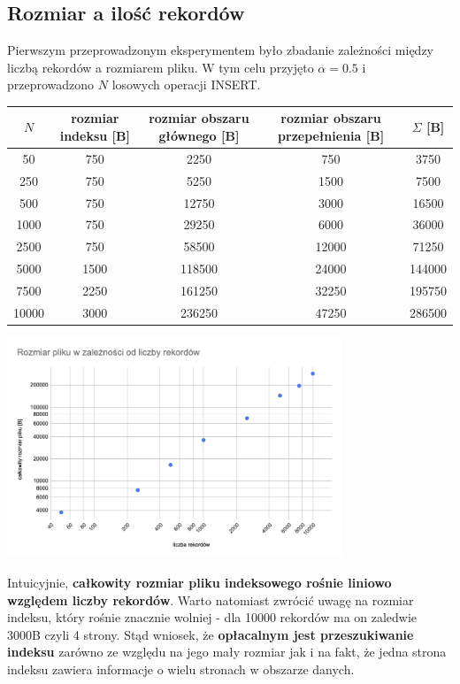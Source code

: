 \documentclass{article}
\begin{document}
\subsection{Rozmiar a ilość rekordów}
Pierwszym przeprowadzonym eksperymentem było zbadanie zależności między liczbą rekordów a rozmiarem pliku.  W tym celu przyjęto $\alpha = 0.5$ i przeprowadzono $N$ losowych operacji INSERT.
\begin{center}
\begin{tabular}{ c | c c c | c}
 $N$ & rozmiar indeksu [B] & rozmiar obszaru głównego [B] & rozmiar obszaru przepełnienia [B] & $\Sigma$ [B]  \\ 
\hline
  50 & 750 & 2250 & 750 & 3750 \\
  250 & 750 & 5250 & 1500 & 7500 \\
  500  & 750 & 12750 & 3000 & 16500 \\
  1000 & 750 & 29250 & 6000 & 36000 \\
  2500 & 750 & 58500 &  12000 & 71250 \\
  5000 & 1500 & 118500 & 24000 & 144000 \\
  7500 & 2250 & 161250 & 32250 & 195750 \\
  10000 & 3000 & 236250 & 47250 & 286500\\
\end{tabular}
\includegraphics[width=10cm]{rozmiar_rekordy}
\end{center}
Intuicyjnie, \textbf{całkowity rozmiar pliku indeksowego rośnie liniowo względem liczby rekordów}.  Warto natomiast zwrócić uwagę na rozmiar indeksu, który rośnie znacznie wolniej - dla 10000 rekordów ma on zaledwie 3000B czyli 4 strony. Stąd
wniosek, że \textbf{opłacalnym jest przeszukiwanie indeksu} zarówno ze względu na jego mały rozmiar jak i na fakt, że jedna strona indeksu zawiera informacje o wielu stronach w obszarze danych.
\end{document}
